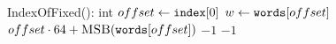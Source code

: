 \PROCEDURE IndexOfFixed(): int
  \STATE $offset \leftarrow \texttt{index}[0]$
  \STATE $w \leftarrow \texttt{words}[offset]$
    \RETURN $offset \cdot 64 + \textsc{MSB}(\texttt{words}[offset])$
  \ELSE
    \RETURN $-1$
  \ENDIF
\ELSE
  \RETURN $-1$
\ENDIF